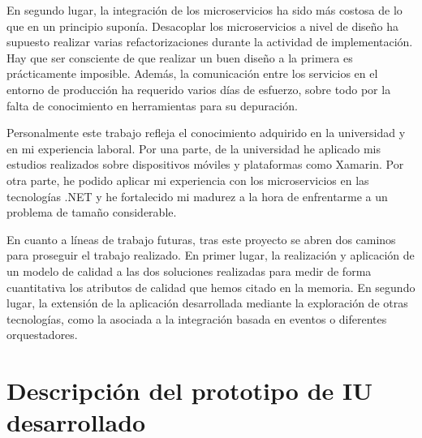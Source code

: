 \documentclass[11pt,spanish,listoffigures]{tfgetsinf}
\begin{document}
En segundo lugar, la integración de los microservicios ha sido más costosa de lo que en un principio suponía. Desacoplar los microservicios a nivel de diseño ha supuesto realizar varias refactorizaciones durante la actividad de implementación. Hay que ser consciente de que realizar un buen diseño a la primera es prácticamente imposible. Además, la comunicación entre los servicios en el entorno de producción ha requerido varios días de esfuerzo, sobre todo por la falta de conocimiento en herramientas para su depuración.

Personalmente este trabajo refleja el conocimiento adquirido en la universidad y en mi experiencia laboral. Por una parte, de la universidad he aplicado mis estudios realizados sobre dispositivos móviles y plataformas como Xamarin. Por otra parte, he podido aplicar mi experiencia con los microservicios en las tecnologías .NET y he fortalecido mi madurez a la hora de enfrentarme a un problema de tamaño considerable.

En cuanto a líneas de trabajo futuras, tras este proyecto se abren dos caminos para proseguir el trabajo realizado. En primer lugar, la realización y aplicación de un modelo de calidad a las dos soluciones realizadas para medir de forma cuantitativa los atributos de calidad que hemos citado en la memoria. En segundo lugar, la extensión de la aplicación desarrollada mediante la exploración de otras tecnologías, como la asociada a la integración basada en eventos o diferentes orquestadores.


\renewcommand{\bibname}{Referencias}




\APPENDIX

%

\chapter{Descripción del prototipo de IU desarrollado} \label{ch:ModeloNavegacion}
\end{document}
